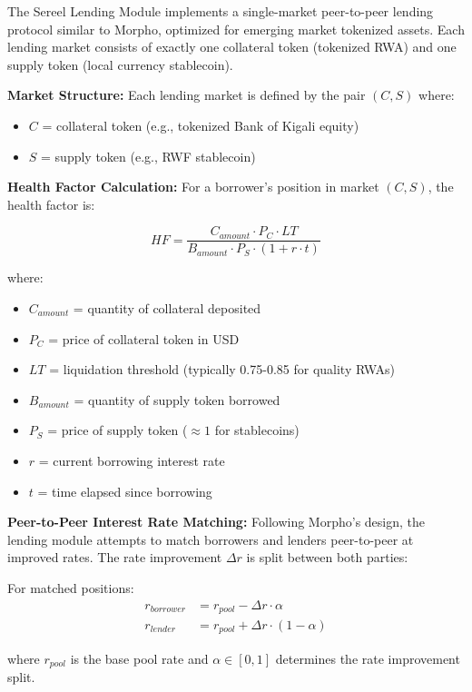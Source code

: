 \documentclass[12pt]{article}
\begin{document}
The Sereel Lending Module implements a single-market peer-to-peer lending protocol similar to Morpho, optimized for emerging market tokenized assets. Each lending market consists of exactly one collateral token (tokenized RWA) and one supply token (local currency stablecoin).

\textbf{Market Structure:}
Each lending market is defined by the pair $(C, S)$ where:
\begin{itemize}
\item $C$ = collateral token (e.g., tokenized Bank of Kigali equity)
\item $S$ = supply token (e.g., RWF stablecoin)
\end{itemize}

\textbf{Health Factor Calculation:}
For a borrower's position in market $(C, S)$, the health factor is:

\begin{equation}
HF = \frac{C_{amount} \cdot P_C \cdot LT}{B_{amount} \cdot P_S \cdot (1 + r \cdot t)}
\end{equation}

where:
\begin{itemize}
\item $C_{amount}$ = quantity of collateral deposited
\item $P_C$ = price of collateral token in USD
\item $LT$ = liquidation threshold (typically 0.75-0.85 for quality RWAs)
\item $B_{amount}$ = quantity of supply token borrowed
\item $P_S$ = price of supply token ($\approx 1$ for stablecoins)
\item $r$ = current borrowing interest rate
\item $t$ = time elapsed since borrowing
\end{itemize}

\textbf{Peer-to-Peer Interest Rate Matching:}
Following Morpho's design, the lending module attempts to match borrowers and lenders peer-to-peer at improved rates. The rate improvement $\Delta r$ is split between both parties:

For matched positions:
\begin{align}
r_{borrower} &= r_{pool} - \Delta r \cdot \alpha \\
r_{lender} &= r_{pool} + \Delta r \cdot (1 - \alpha)
\end{align}

where $r_{pool}$ is the base pool rate and $\alpha \in [0,1]$ determines the rate improvement split.
\end{document}
